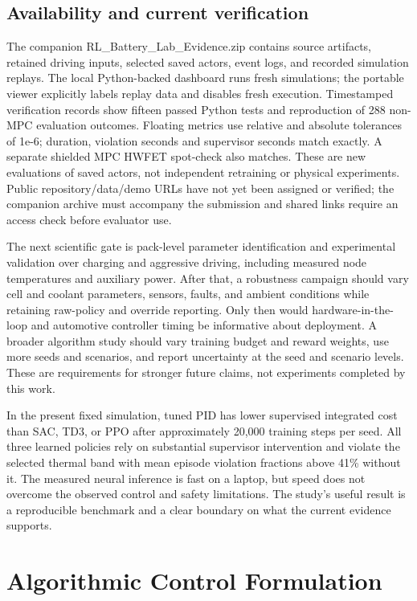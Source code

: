 \documentclass[conference]{IEEEtran}
\begin{document}
\subsection{Availability and current verification}
The companion RL\_Battery\_Lab\_Evidence.zip contains source artifacts, retained driving inputs, selected saved actors, event logs, and recorded simulation replays. The local Python-backed dashboard runs fresh simulations; the portable viewer explicitly labels replay data and disables fresh execution. Timestamped verification records show fifteen passed Python tests and reproduction of 288 non-MPC evaluation outcomes. Floating metrics use relative and absolute tolerances of 1e-6; duration, violation seconds and supervisor seconds match exactly. A separate shielded MPC HWFET spot-check also matches. These are new evaluations of saved actors, not independent retraining or physical experiments. Public repository/data/demo URLs have not yet been assigned or verified; the companion archive must accompany the submission and shared links require an access check before evaluator use.

The next scientific gate is pack-level parameter identification and experimental validation over charging and aggressive driving, including measured node temperatures and auxiliary power. After that, a robustness campaign should vary cell and coolant parameters, sensors, faults, and ambient conditions while retaining raw-policy and override reporting. Only then would hardware-in-the-loop and automotive controller timing be informative about deployment. A broader algorithm study should vary training budget and reward weights, use more seeds and scenarios, and report uncertainty at the seed and scenario levels. These are requirements for stronger future claims, not experiments completed by this work.

In the present fixed simulation, tuned PID has lower supervised integrated cost than SAC, TD3, or PPO after approximately 20,000 training steps per seed. All three learned policies rely on substantial supervisor intervention and violate the selected thermal band with mean episode violation fractions above 41\% without it. The measured neural inference is fast on a laptop, but speed does not overcome the observed control and safety limitations. The study's useful result is a reproducible benchmark and a clear boundary on what the current evidence supports.

\appendices
\section{Algorithmic Control Formulation}
\end{document}
